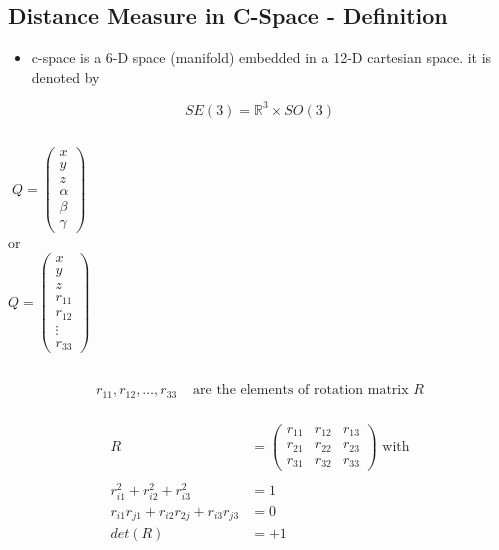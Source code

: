 \documentclass[%
  professionalfonts,%
  xcolor={%
    usenames,%
    dvipsnames,%
    svgnames,%
    table,%
    hyperref%
  }%
]{beamer}
\begin{document}
\subsection{Distance Measure in C-Space - Definition}
\begin{frame}
	
\begin{itemize}
\item c-space is a 6-D space (manifold) embedded in a 12-D cartesian space. it is denoted by
\end{itemize}

\begin{equation*}
	SE(3) = \mathbb{R}^{3} \times SO(3) \label{eq:seso}
\end{equation*}

\begin{columns}
\begin{equation*}
Q = \left( \begin{array}{c} x \\ y \\ z \\ \alpha \\ \beta \\ \gamma \end{array} \right)
\end{equation*}
or
\begin{equation*}
Q = \left( \begin{array}{c} x \\ y \\ z \\ r_{11} \\ r_{12} \\ \vdots \\ r_{33} \end{array} \right)
\end{equation*}
\end{columns}

\begin{align*}
r_{11},r_{12},\dotsc,r_{33} & \text{ are the elements of rotation matrix } R \\
\end{align*}

\end{frame}

\begin{frame}
\begin{align*}
R & = \begin{pmatrix}
r_{11} & r_{12} & r_{13} \\
r_{21} & r_{22} & r_{23} \\
r_{31} & r_{32} & r_{33}
\end{pmatrix} \text{ with} \\ \\
r_{i1}^2+r_{i2}^2+r_{i3}^2 & = 1 \\
r_{i1}r_{j1} + r_{i2}r_{2j} + r_{i3}r_{j3} & = 0 \\
det(R) & = +1
\end{align*}
\end{frame}
\end{document}
